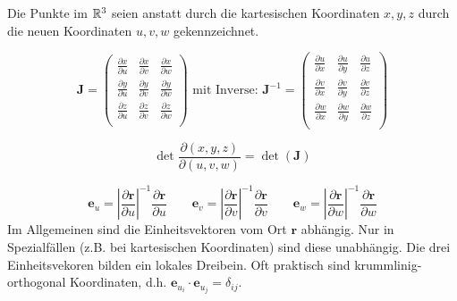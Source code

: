 Die Punkte im $\mathbb{R}^3$ seien anstatt durch die kartesischen Koordinaten $x,y,z$ durch die neuen Koordinaten $u,v,w$ gekennzeichnet.

\begin{frameddefn}
\[
\mathbf{J} =
\left(\begin{array}{rrr} 
	\frac{\partial x}{\partial u} & \frac{\partial x}{\partial v} & \frac{\partial x}{\partial w} \\ 
	\frac{\partial y}{\partial u} & \frac{\partial y}{\partial v} & \frac{\partial y}{\partial w} \\ 
	\frac{\partial z}{\partial u} & \frac{\partial z}{\partial v} & \frac{\partial z}{\partial w} \\ 
\end{array}\right)
\textrm{ mit Inverse: }
\mathbf{J}^{-1} = 
\left(\begin{array}{rrr} 
	\frac{\partial u}{\partial x} & \frac{\partial u}{\partial y} & \frac{\partial u}{\partial z} \\ 
	\frac{\partial v}{\partial x} & \frac{\partial v}{\partial y} & \frac{\partial v}{\partial z} \\ 
	\frac{\partial w}{\partial x} & \frac{\partial w}{\partial y} & \frac{\partial w}{\partial z} \\ 
\end{array}\right)
\]
\end{frameddefn}

\begin{frameddefn}[Funktionaldeterminante]
\[	
\det \frac{\partial (x,y,z)}{\partial (u,v,w)} = \det(\mathbf{J})
\]
\end{frameddefn}

\begin{framedprop}
\[
\mathbf{e}_u = \left| \frac{\partial \mathbf{r}}{\partial u} \right|^{-1} \frac{\partial \mathbf{r}}{\partial u} \qquad
 \mathbf{e}_v = \left| \frac{\partial \mathbf{r}}{\partial v} \right|^{-1} \frac{\partial \mathbf{r}}{\partial v} \qquad
 \mathbf{e}_w = \left| \frac{\partial \mathbf{r}}{\partial w} \right|^{-1} \frac{\partial \mathbf{r}}{\partial w}
\]
Im Allgemeinen sind die Einheitsvektoren vom Ort $\mathbf{r}$ abhängig. Nur in Spezialfällen (z.B. bei kartesischen Koordinaten) sind diese unabhängig. Die drei Einheitsvekoren bilden ein lokales Dreibein. Oft praktisch sind krummlinig-orthogonal Koordinaten, d.h. $\mathbf{e}_{u_{i}} \cdot \mathbf{e}_{u_{j}} = \delta_{ij}$.
\end{framedprop}

